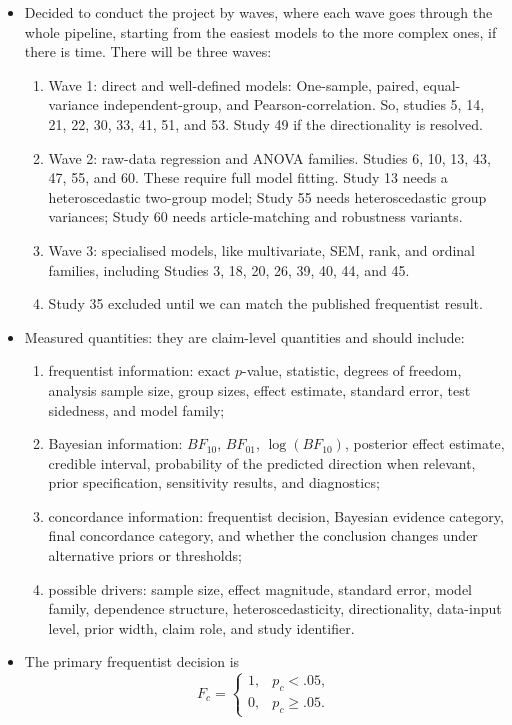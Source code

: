 \documentclass[11pt,a4paper]{article}
\begin{document}
\begin{itemize}
\begin{enumerate}
    \end{enumerate}
    \item Decided to conduct the project by waves, where each wave goes through the whole pipeline, starting from the easiest models to the more complex ones, if there is time. There will be three waves:
    \begin{enumerate}
        \item Wave 1: direct and well-defined models: One-sample, paired, equal-variance independent-group, and Pearson-correlation. So, studies 5, 14, 21, 22, 30, 33, 41, 51, and 53. Study 49 if the directionality is resolved.
        \item Wave 2: raw-data regression and ANOVA families. Studies 6, 10, 13, 43, 47, 55, and 60. These require full model fitting. Study 13 needs a heteroscedastic two-group model; Study 55 needs heteroscedastic group variances; Study 60 needs article-matching and robustness variants.
        \item Wave 3: specialised models, like multivariate, SEM, rank, and ordinal families, including Studies 3, 18, 20, 26, 39, 40, 44, and 45.
        \item Study 35 excluded until we can match the published frequentist result.
        \end{enumerate}
    \item Measured quantities: they are claim-level quantities and should include:
    \begin{enumerate}
        \item frequentist information: exact \(p\)-value, statistic, degrees of freedom, analysis sample size, group sizes, effect estimate, standard error, test sidedness, and model family;
        \item Bayesian information: \(BF_{10}\), \(BF_{01}\), \(\log(BF_{10})\), posterior effect estimate, credible interval, probability of the predicted direction when relevant, prior specification, sensitivity results, and diagnostics;
        \item concordance information: frequentist decision, Bayesian evidence category, final concordance category, and whether the conclusion changes under alternative priors or thresholds;
        \item possible drivers: sample size, effect magnitude, standard error, model family, dependence structure, heteroscedasticity, directionality, data-input level, prior width, claim role, and study identifier.
    \end{enumerate}
    \item The primary frequentist decision is
\[
F_c =
\begin{cases}
1, & p_c<.05,\\
0, & p_c\geq .05.
\end{cases}
\]


\end{itemize}
\end{document}

